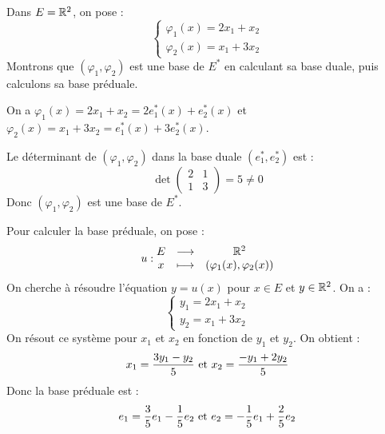 \documentclass[11pt,a4paper]{report}
\begin{document}
\begin{example}
    Dans $E = \mathbb{R}^2$, on pose :
    $$\begin{cases}
        \varphi_1(x) = 2x_1 + x_2 \\
        \varphi_2(x) = x_1 + 3x_2
    \end{cases}$$
    Montrons que $(\varphi_1, \varphi_2)$ est une base de $E^*$ en calculant sa base duale, puis calculons sa base préduale.
\end{example}

\begin{correction}
    On a $\varphi_1(x) = 2x_1 + x_2 = 2e_1^*(x) + e_2^*(x)$ et $\varphi_2(x) = x_1 + 3x_2 = e_1^*(x) + 3e_2^*(x)$.
    
    Le déterminant de $(\varphi_1, \varphi_2)$ dans la base duale $(e_1^*, e_2^*)$ est :
    $$\det\begin{pmatrix}2 & 1 \\ 1 & 3\end{pmatrix} = 5 \ne 0$$
    Donc $(\varphi_1, \varphi_2)$ est une base de $E^*$.

    Pour calculer la base préduale, on pose :
    $$u : \begin{matrix} E & \longrightarrow & \mathbb{R}^2 \\ x & \longmapsto & (\varphi_1(x), \varphi_2(x)) \end{matrix}$$
    On cherche à résoudre l'équation $y = u(x)$ pour $x \in E$ et $y \in \mathbb{R}^2$. On a :
    $$\begin{cases}
        y_1 = 2x_1 + x_2 \\
        y_2 = x_1 + 3x_2
    \end{cases}$$
    On résout ce système pour $x_1$ et $x_2$ en fonction de $y_1$ et $y_2$. On obtient :
    $$x_1 = \frac{3y_1 - y_2}{5} \text{ et } x_2 = \frac{-y_1 + 2y_2}{5}$$
    Donc la base préduale est :
    $$e_1 = \frac{3}{5} e_1 - \frac{1}{5} e_2 \text{ et } e_2 = -\frac{1}{5} e_1 + \frac{2}{5} e_2$$
\end{correction}
\end{document}
